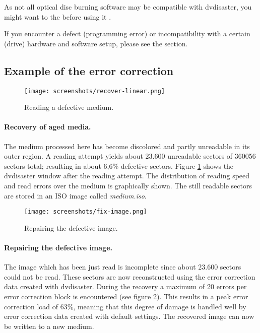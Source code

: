 \smallskip

As not all optical disc burning software may be compatible with dvdisaster,
you might want to 
the  before using it .

\smallskip

If you encounter a defect (programming error) or
incompatibility with a certain (drive) hardware and software setup,
please see the  section.


\subsection{Example of the error correction}

\begin{figure}[h]
\centerline{\texttt{[image: screenshots/recover-linear.png]}}
\caption{Reading a defective medium.}  
\label{recover-linear}
\end{figure}

\paragraph{Recovery of aged media.} 
The medium processed here has become discolored and partly unreadable in its outer region.
A reading attempt yields about 23.600 unreadable sectors of 360056 sectors total;
resulting in about 6,6\% defective sectors. Figure \ref{recover-linear} shows the
dvdisaster window after the reading attempt. The distribution of reading speed and
read errors over the medium is graphically shown.
The still readable sectors are stored in an ISO image called {\em medium.iso}.

\begin{figure}[t]
\centerline{\texttt{[image: screenshots/fix-image.png]}}
\caption{Repairing the defective image.}  
\label{fix-image}
\end{figure}

\paragraph{Repairing the defective image.} 
The image which has been just read is incomplete since about 23.600 sectors could
not be read. These sectors are now reconstructed using the error correction data
created with dvdisaster. During the recovery a maximum of 20 errors per error
correction block is encountered (see figure \ref{fix-image}).
This results in a peak error correction load of
63\%, meaning that this degree of damage is handled well by error correction data
created with default settings. The recovered image can now be written to a new medium.

